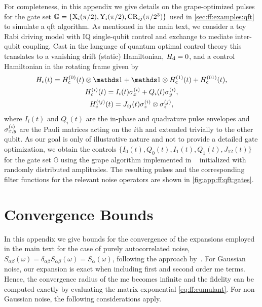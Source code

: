 For completeness, in this appendix we give details on the \gls{grape}-optimized pulses for the gate set $\mathbb{G} = \lbrace\mathrm{X}_{i}(\pi/2),\mathrm{Y}_{i}(\pi/2),\mathrm{CR}_{ij}(\pi/2^3)\rbrace$ used in \cref{sec:ff:examples:qft} to simulate a \gls{qft} algorithm.
As mentioned in the main text, we consider a toy Rabi driving model with IQ single-qubit control and exchange to mediate inter-qubit coupling.
Cast in the language of quantum optimal control theory this translates to a vanishing drift (static) Hamiltonian, $H_{\mathrm{d}} =  0$, and a control Hamiltonian in the rotating frame given by
\begin{gather}
    \Hc(t) = \Hc\gth{0}(t)\otimes\eye + \eye\otimes\Hc\gth{1}(t) + \Hc\gth{01}(t), \\
    \Hc\gth{i}(t) = I_i(t)\sx\gth{i} + Q_i(t)\sy\gth{i}, \\
    \Hc\gth{ij}(t) = J_{ij}(t)\sz\gth{i}\otimes\sz\gth{j},
\end{gather}
where $I_i(t)$ and $Q_i(t)$ are the in-phase and quadrature pulse envelopes and $\sigma_{x,y}^{(i)}$ are the Pauli matrices acting on the $i$th and extended trivially to the other qubit.
As our goal is only of illustrative nature and not to provide a detailed gate optimization, we obtain the controls $\lbrace I_0(t), Q_0(t), I_1(t), Q_1(t), J_{12}(t)\rbrace$ for the gate set $\mathbb{G}$ using the \gls{grape} algorithm implemented in \qutip~\cite{Johansson2012} initialized with randomly distributed amplitudes.
The resulting pulses and the corresponding filter functions for the relevant noise operators are shown in \cref{fig:app:ff:qft:gates}.

\section{Convergence Bounds}\label{sec:app:ff:convergence}
In this appendix we give bounds for the convergence of the expansions employed in the main text for the case of purely autocorrelated noise, $S_{\alpha\beta}(\omega) = \delta_{\alpha\beta}S_{\alpha\beta}(\omega) =  S_\alpha(\omega)$, following the approach by~\citet{Green2013}.
For Gaussian noise, our expansion is exact when including first and second order \acrfull{me} terms.
Hence, the convergence radius of the \gls{me} becomes infinite and the fidelity can be computed exactly by evaluating the matrix exponential \cref{eq:ff:cumulant}.
For non-Gaussian noise, the following considerations apply.
